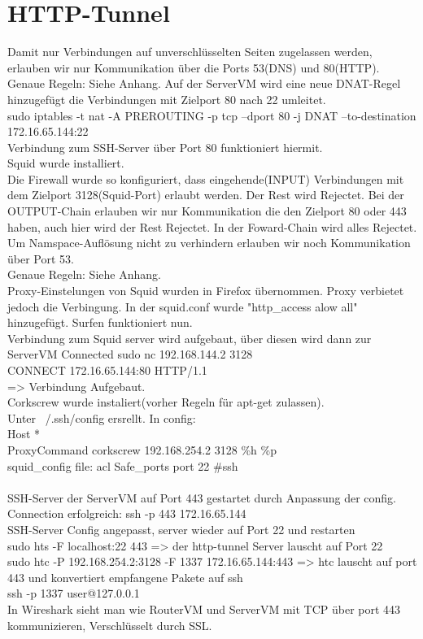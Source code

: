 \documentclass[12pt]{article}
\theoremstyle{plain}
\begin{document}
\section{HTTP-Tunnel}
Damit nur Verbindungen auf unverschlüsselten Seiten zugelassen werden, erlauben wir nur Kommunikation über die Ports 53(DNS) und 80(HTTP). \\ Genaue Regeln: Siehe Anhang.
Auf der ServerVM wird eine neue DNAT-Regel hinzugefügt die Verbindungen mit Zielport 80 nach 22 umleitet.\\
sudo iptables -t nat -A PREROUTING -p tcp --dport 80 -j DNAT --to-destination 172.16.65.144:22\\
Verbindung zum SSH-Server über Port 80 funktioniert hiermit.\\
Squid wurde installiert.\\
Die Firewall wurde so konfiguriert, dass eingehende(INPUT) Verbindungen mit dem Zielport 3128(Squid-Port) erlaubt werden. Der Rest wird Rejectet. Bei der OUTPUT-Chain erlauben wir nur Kommunikation die den Zielport 80 oder 443 haben, auch hier wird der Rest Rejectet. In der Foward-Chain wird alles Rejectet. Um Namspace-Auflösung nicht zu verhindern erlauben wir noch Kommunikation über Port 53.\\ Genaue Regeln: Siehe Anhang.\\
Proxy-Einstelungen von Squid wurden in Firefox übernommen. Proxy verbietet jedoch die Verbingung. In der squid.conf wurde "http\_access alow all" hinzugefügt. Surfen funktioniert nun.\\
Verbindung zum Squid server wird aufgebaut, über diesen wird dann zur ServerVM Connected
sudo nc 192.168.144.2 3128\\
CONNECT 172.16.65.144:80 HTTP/1.1\\
=> Verbindung Aufgebaut.\\
Corkscrew wurde instaliert(vorher Regeln für apt-get zulassen).\\
Unter ~/.ssh/config ersrellt. In config:\\
Host *\\
ProxyCommand corkscrew 192.168.254.2 3128 \%h \%p\\
squid\_config file: acl Safe\_ports port 22 \#ssh\\\\
SSH-Server der ServerVM auf Port 443 gestartet durch Anpassung der config.
Connection erfolgreich: ssh -p 443 172.16.65.144\\
SSH-Server Config angepasst, server wieder auf Port 22 und restarten\\
sudo hts -F localhost:22 443 => der http-tunnel Server lauscht auf Port 22\\
sudo htc -P 192.168.254.2:3128 -F 1337 172.16.65.144:443 => htc lauscht auf port 443 und konvertiert empfangene Pakete auf ssh\\
ssh -p 1337 user@127.0.0.1\\
In Wireshark sieht man wie RouterVM und ServerVM mit TCP über port 443 kommunizieren, Verschlüsselt durch SSL.\\
\end{document}
